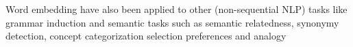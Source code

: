 Word embedding have also been applied to other (non-sequential NLP) tasks like grammar induction \cite{Spitkovsky:2011} and semantic tasks such as semantic relatedness, synonymy detection, concept categorization selection preferences and analogy \cite{baroni:2014}





